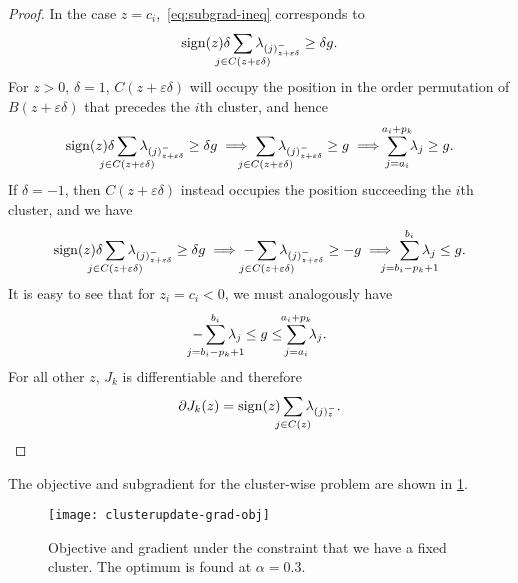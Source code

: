 \begin{proof}
  In the case \(z = c_i\),~\eqref{eq:subgrad-ineq} corresponds to 
  \begin{equation}
    \label{eq:subgrad-ineq-nonzero}
    \sign(z)\delta \smashoperator{\sum_{j \in C(z + \varepsilon\delta)}} \lambda_{(j)^-_{z + \varepsilon\delta}} \geq \delta g.
  \end{equation}
  For \(z > 0\), \(\delta = 1\), \(C(z + \varepsilon\delta)\) will occupy the position
  in the order permutation of \(B(z + \varepsilon\delta)\) that precedes the \(i\)th
  cluster, and hence
  \begin{equation*}
    \sign(z)\delta \smashoperator{\sum_{j \in C(z + \varepsilon\delta)}} \lambda_{(j)^-_{z + \varepsilon\delta}} \geq \delta g
    \implies
    \smashoperator{\sum_{j \in C(z + \varepsilon\delta)}} \lambda_{(j)^-_{z + \varepsilon\delta}} \geq g \implies
    \smashoperator{\sum_{j = a_i}^{a_i + p_k}} \lambda_j \geq g.
  \end{equation*}
  If \(\delta = -1\), then \(C(z + \varepsilon\delta)\) instead occupies the
  position succeeding the \(i\)th cluster, and we have
  \begin{equation*}
    \sign(z)\delta \smashoperator{\sum_{j \in C(z + \varepsilon\delta)}} \lambda_{(j)^-_{z + \varepsilon\delta}} \geq \delta g
    \implies
    -\smashoperator{\sum_{j \in C(z + \varepsilon\delta)}} \lambda_{(j)^-_{z + \varepsilon\delta}} \geq -g \implies
    \smashoperator{\sum_{j = b_i - p_k + 1}^{b_i}} \lambda_j \leq g.
  \end{equation*}
  It is easy to see that for \(z_i = c_i < 0\), we must analogously have
  \[
    -\smashoperator{\sum_{j = b_i - p_k + 1}^{b_i}} \lambda_j
    \leq g \leq
    \smashoperator{\sum_{j = a_i}^{a_i + p_k}} \lambda_j.
  \]
  For all other \(z\), \(J_k\) is differentiable and therefore
  \[
    \partial J_k(z) = \sign(z) \smashoperator{\sum_{j \in C(z)}} \lambda_{(j)^-_z}.
  \]
\end{proof}

The objective and subgradient for the cluster-wise problem are shown in
\cref{fig:cluster-grad-obj}.

\begin{figure}[htbp]
  \centering
  \texttt{[image: clusterupdate-grad-obj]}
  \caption{%
    Objective and gradient under the constraint that we have a fixed
    cluster.
    The optimum is found at \(\alpha = 0.3\).
  }%
  \label{fig:cluster-grad-obj}
\end{figure}

